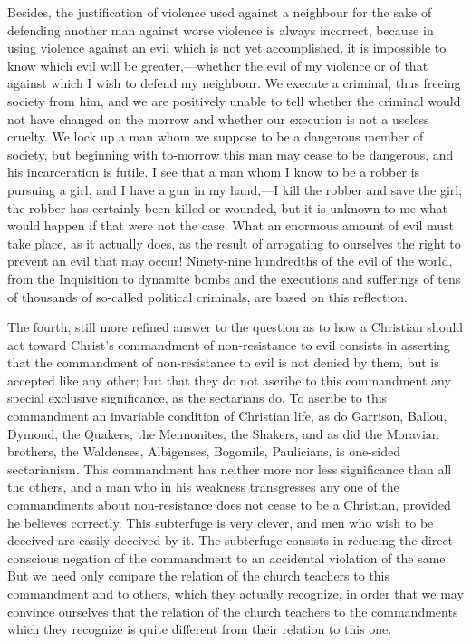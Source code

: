 \documentclass{book}
\begin{document}
Besides, the justification of violence used against a neighbour for the sake of defending another man against worse violence is always incorrect, because in using violence against an evil which is not yet accomplished, it is impossible to know which evil will be greater,—whether the evil of my violence or of that against which I wish to defend my neighbour. We execute a criminal, thus freeing society from him, and we are positively unable to tell whether the criminal would not have changed on the morrow and whether our execution is not a useless cruelty. We lock up a man whom we suppose to be a dangerous member of society, but beginning with to-morrow this man may cease to be dangerous, and his incarceration is futile. I see that a man whom I know to be a robber is pursuing a girl, and I have a gun in my hand,—I kill the robber and save the girl; the robber has certainly been killed or wounded, but it is unknown to me what would happen if that were not the case. What an enormous amount of evil must take place, as it actually does, as the result of arrogating to ourselves the right to prevent an evil that may occur! Ninety-nine hundredths of the evil of the world, from the Inquisition to dynamite bombs and the executions and sufferings of tens of thousands of so-called political criminals, are based on this reflection.

The fourth, still more refined answer to the question as to how a Christian should act toward Christ’s commandment of non-resistance to evil consists in asserting that the commandment of non-resistance to evil is not denied by them, but is accepted like any other; but that they do not ascribe to this commandment any special exclusive significance, as the sectarians do. To ascribe to this commandment an invariable condition of Christian life, as do Garrison, Ballou, Dymond, the Quakers, the Mennonites, the Shakers, and as did the Moravian brothers, the Waldenses, Albigenses, Bogomils, Paulicians, is one-sided sectarianism. This commandment has neither more nor less significance than all the others, and a man who in his weakness transgresses any one of the commandments about non-resistance does not cease to be a Christian, provided he believes correctly. This subterfuge is very clever, and men who wish to be deceived are easily deceived by it. The subterfuge consists in reducing the direct conscious negation of the commandment to an accidental violation of the same. But we need only compare the relation of the church teachers to this commandment and to others, which they actually recognize, in order that we may convince ourselves that the relation of the church teachers to the commandments which they recognize is quite different from their relation to this one.
\end{document}
